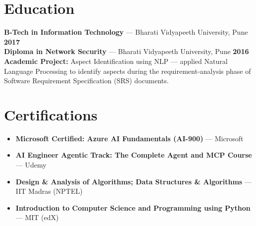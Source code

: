 \documentclass[10pt,a4paper]{article}
\begin{document}
\section{Education}
\small
\noindent \textbf{B-Tech in Information Technology} --- Bharati Vidyapeeth University, Pune \hfill \textbf{2017} \\
\noindent \textbf{Diploma in Network Security} --- Bharati Vidyapeeth University, Pune \hfill \textbf{2016} \\[3pt]
\noindent \textbf{\color{primary2}Academic Project:} Aspect Identification using NLP --- applied Natural Language Processing to identify aspects during the requirement-analysis phase of Software Requirement Specification (SRS) documents.
\normalsize

\section{Certifications}
\small
\begin{itemize}
    \item \textbf{Microsoft Certified: Azure AI Fundamentals (AI-900)} --- Microsoft
    \item \textbf{AI Engineer Agentic Track: The Complete Agent and MCP Course} --- Udemy
    \item \textbf{Design \& Analysis of Algorithms; Data Structures \& Algorithms} --- IIT Madras (NPTEL)
    \item \textbf{Introduction to Computer Science and Programming using Python} --- MIT (edX)
\end{itemize}
\normalsize
\end{document}
